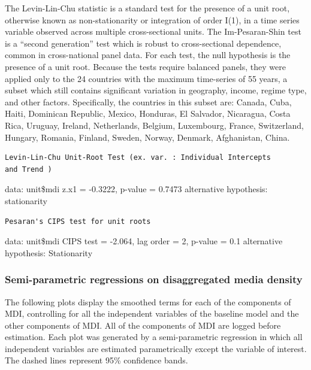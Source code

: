 \documentclass[12pt,article,oneside]{memoir}
\begin{document}
The Levin-Lin-Chu statistic is a standard test for the presence of a
unit root, otherwise known as non-stationarity or integration of order
I(1), in a time series variable observed across multiple cross-sectional
units. The Im-Pesaran-Shin test is a ``second generation'' test which is
robust to cross-sectional dependence, common in cross-national panel
data. For each test, the null hypothesis is the presence of a unit root.
Because the tests require balanced panels, they were applied only to the
24 countries with the maximum time-series of 55 years, a subset which
still contains significant variation in geography, income, regime type,
and other factors. Specifically, the countries in this subset are:
Canada, Cuba, Haiti, Dominican Republic, Mexico, Honduras, El Salvador,
Nicaragua, Costa Rica, Uruguay, Ireland, Netherlands, Belgium,
Luxembourg, France, Switzerland, Hungary, Romania, Finland, Sweden,
Norway, Denmark, Afghanistan, China.

\begin{verbatim}
Levin-Lin-Chu Unit-Root Test (ex. var. : Individual Intercepts
and Trend )
\end{verbatim}

data: unit\$mdi z.x1 = -0.3222, p-value = 0.7473 alternative hypothesis:
stationarity

\begin{verbatim}
Pesaran's CIPS test for unit roots
\end{verbatim}

data: unit\$mdi CIPS test = -2.064, lag order = 2, p-value = 0.1
alternative hypothesis: Stationarity

\subsubsection{Semi-parametric regressions on disaggregated media
density}\label{semi-parametric-regressions-on-disaggregated-media-density}

The following plots display the smoothed terms for each of the
components of MDI, controlling for all the independent variables of the
baseline model and the other components of MDI. All of the components of
MDI are logged before estimation. Each plot was generated by a
semi-parametric regression in which all independent variables are
estimated parametrically except the variable of interest. The dashed
lines represent 95\% confidence bands.
\end{document}
